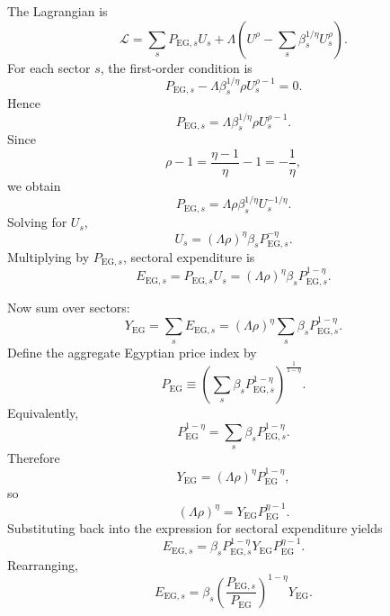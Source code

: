 \documentclass[11pt]{article}
\begin{document}
The Lagrangian is
\begin{equation}
\mathcal{L}=\sum_s P_{\mathrm{EG},s}U_s + \Lambda\left(U^{\rho}-\sum_s \beta_s^{1/\eta}U_s^{\rho}\right).
\end{equation}
For each sector \(s\), the first-order condition is
\begin{equation}
P_{\mathrm{EG},s} - \Lambda\beta_s^{1/\eta}\rho U_s^{\rho-1}=0.
\end{equation}
Hence
\begin{equation}
P_{\mathrm{EG},s}=\Lambda\beta_s^{1/\eta}\rho U_s^{\rho-1}.
\end{equation}
Since
\begin{equation}
\rho-1 = \frac{\eta-1}{\eta}-1 = -\frac{1}{\eta},
\end{equation}
we obtain
\begin{equation}
P_{\mathrm{EG},s}=\Lambda\rho\beta_s^{1/\eta}U_s^{-1/\eta}.
\end{equation}
Solving for \(U_s\),
\begin{equation}
U_s = (\Lambda\rho)^\eta\beta_s P_{\mathrm{EG},s}^{-\eta}.
\end{equation}
Multiplying by \(P_{\mathrm{EG},s}\), sectoral expenditure is
\begin{equation}
E_{\mathrm{EG},s}=P_{\mathrm{EG},s}U_s = (\Lambda\rho)^\eta\beta_s P_{\mathrm{EG},s}^{1-\eta}.
\end{equation}

Now sum over sectors:
\begin{equation}
Y_{\mathrm{EG}} = \sum_s E_{\mathrm{EG},s} = (\Lambda\rho)^\eta\sum_s \beta_s P_{\mathrm{EG},s}^{1-\eta}.
\end{equation}
Define the aggregate Egyptian price index by
\begin{equation}
P_{\mathrm{EG}} \equiv \left(\sum_s \beta_s P_{\mathrm{EG},s}^{1-\eta}\right)^{\frac{1}{1-\eta}}.
\end{equation}
Equivalently,
\begin{equation}
P_{\mathrm{EG}}^{1-\eta}=\sum_s \beta_s P_{\mathrm{EG},s}^{1-\eta}.
\end{equation}
Therefore
\begin{equation}
Y_{\mathrm{EG}} = (\Lambda\rho)^\eta P_{\mathrm{EG}}^{1-\eta},
\end{equation}
so
\begin{equation}
(\Lambda\rho)^\eta = Y_{\mathrm{EG}}P_{\mathrm{EG}}^{\eta-1}.
\end{equation}
Substituting back into the expression for sectoral expenditure yields
\begin{equation}
E_{\mathrm{EG},s}=\beta_s P_{\mathrm{EG},s}^{1-\eta}Y_{\mathrm{EG}}P_{\mathrm{EG}}^{\eta-1}.
\end{equation}
Rearranging,
\begin{equation}
E_{\mathrm{EG},s}=\beta_s\left(\frac{P_{\mathrm{EG},s}}{P_{\mathrm{EG}}}\right)^{1-\eta}Y_{\mathrm{EG}}.
\label{eq:sector_expenditure_final}
\end{equation}
\end{document}
